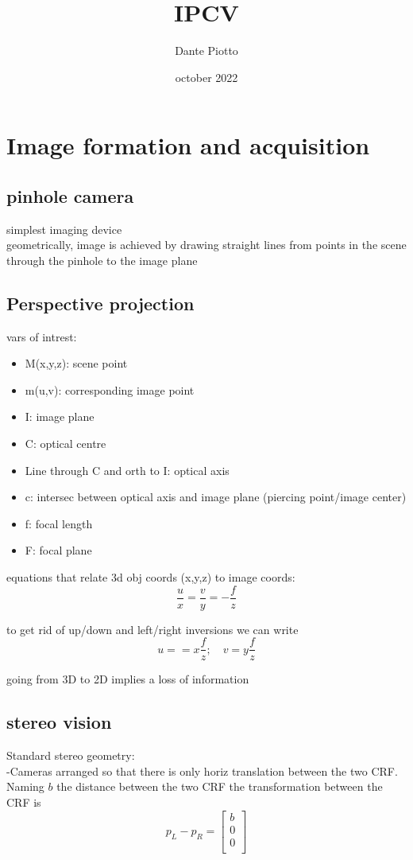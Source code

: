 \documentclass{article}
\title{IPCV}
\author{Dante Piotto}
\date{october 2022}
\begin{document}
\section{Image formation and acquisition}

\subsection{pinhole camera}
simplest imaging device\\
geometrically, image is achieved by drawing straight lines from points in the scene through the pinhole to the image plane

\subsection{Perspective projection}
vars of intrest:
\begin{itemize}
	\item M(x,y,z): scene point
	\item m(u,v): corresponding image point
	\item I: image plane
	\item C: optical centre
	\item Line through C and orth to I: optical axis
	\item c: intersec between optical axis and image plane (piercing point/image center)
	\item f: focal length
	\item F: focal plane
\end{itemize}

equations that relate 3d obj coords (x,y,z) to image coords:
\begin{equation}
	\frac{u}{x} = \frac{v}{y}=- \frac{f}{z}
\end{equation}

to get rid of up/down and left/right inversions we can write
\begin{equation}
		u= = x \frac{f}{z}; \quad v=y \frac{f}{z}
\end{equation}

going from 3D to 2D implies a loss of information

\subsection{stereo vision}

Standard stereo geometry:\\
-Cameras arranged so that there is only horiz translation between the two CRF. Naming $b$ the distance between the two CRF the transformation between the CRF is
\begin{equation}
	p_L-p_R = \begin{bmatrix}
	b\\
	0\\
	0\\
	\end{bmatrix}
\end{equation}
\end{document}
